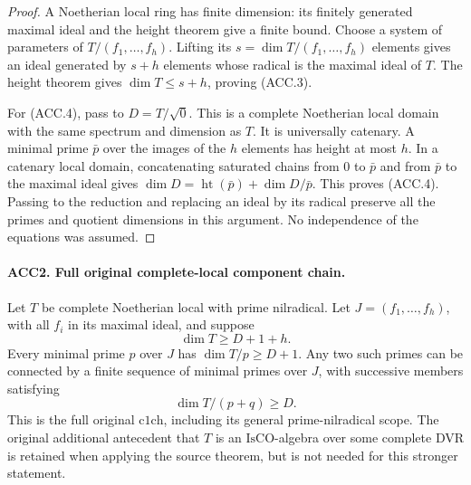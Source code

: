 \documentclass[11pt,a4paper]{article}
\numberwithin{equation}{section}
\theoremstyle{remark}\newtheorem{remark}[theorem]{Remark}
\begin{document}
\begin{proof}
A Noetherian local ring has finite dimension: its finitely generated
maximal ideal and the height theorem give a finite bound.  Choose a
system of parameters of \(T/(f_1,\ldots,f_h)\).  Lifting its
\(s=\dim T/(f_1,\ldots,f_h)\) elements gives an ideal generated by
\(s+h\) elements whose radical is the maximal ideal of \(T\).
The height theorem gives \(\dim T\le s+h\), proving (ACC.3).

For (ACC.4), pass to \(D=T/\sqrt{0}\).  This is a complete
Noetherian local domain with the same spectrum and dimension as
\(T\).  It is universally catenary.  A minimal prime \(\bar p\)
over the images of the \(h\) elements has height at most \(h\).
In a catenary local domain, concatenating saturated chains from
\(0\) to \(\bar p\) and from \(\bar p\) to the maximal ideal
gives
\(\dim D=\operatorname{ht}(\bar p)+\dim D/\bar p\).
This proves (ACC.4).  Passing to the reduction and replacing an
ideal by its radical preserve all the primes and quotient dimensions
in this argument.  No independence of the equations was assumed.
\end{proof}

\paragraph{ACC2. Full original complete-local component chain.}
\label{claim:ACC2}
Let \(T\) be complete Noetherian local with prime nilradical.
Let \(J=(f_1,\ldots,f_h)\), with all \(f_i\) in its maximal
ideal, and suppose
\[
                          \dim T\ge D+1+h.                \tag{ACC.5}
\]
Every minimal prime \(p\) over \(J\) has \(\dim T/p\ge D+1\).
Any two such primes can be connected by a finite sequence of minimal
primes over \(J\), with successive members satisfying
\[
                          \dim T/(p+q)\ge D.              \tag{ACC.6}
\]
This is the full original \(\mathrm{c1ch}\), including its general
prime-nilradical scope.  The original additional antecedent that
\(T\) is an \(\mathrm{IsCO}\)-algebra over some complete DVR is
retained when applying the source theorem, but is not needed for
this stronger statement.
\end{document}
